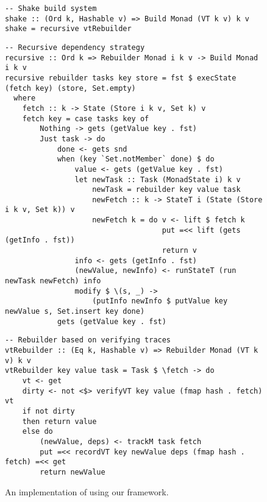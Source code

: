 \begin{figure}
\begin{verbatim}
-- Shake build system
shake :: (Ord k, Hashable v) => Build Monad (VT k v) k v
shake = recursive vtRebuilder
\end{verbatim}
\vspace{1mm}
\begin{verbatim}
-- Recursive dependency strategy
recursive :: Ord k => Rebuilder Monad i k v -> Build Monad i k v
recursive rebuilder tasks key store = fst $ execState (fetch key) (store, Set.empty)
  where
    fetch :: k -> State (Store i k v, Set k) v
    fetch key = case tasks key of
        Nothing -> gets (getValue key . fst)
        Just task -> do
            done <- gets snd
            when (key `Set.notMember` done) $ do
                value <- gets (getValue key . fst)
                let newTask :: Task (MonadState i) k v
                    newTask = rebuilder key value task
                    newFetch :: k -> StateT i (State (Store i k v, Set k)) v
                    newFetch k = do v <- lift $ fetch k
                                    put =<< lift (gets (getInfo . fst))
                                    return v
                info <- gets (getInfo . fst)
                (newValue, newInfo) <- runStateT (run newTask newFetch) info
                modify $ \(s, _) ->
                    (putInfo newInfo $ putValue key newValue s, Set.insert key done)
            gets (getValue key . fst)
\end{verbatim}
\vspace{1mm}
\begin{verbatim}
-- Rebuilder based on verifying traces
vtRebuilder :: (Eq k, Hashable v) => Rebuilder Monad (VT k v) k v
vtRebuilder key value task = Task $ \fetch -> do
    vt <- get
    dirty <- not <$> verifyVT key value (fmap hash . fetch) vt
    if not dirty
    then return value
    else do
        (newValue, deps) <- trackM task fetch
        put =<< recordVT key newValue deps (fmap hash . fetch) =<< get
        return newValue
\end{verbatim}
\vspace{-3mm}
\caption{An implementation of \Shake using our framework.}\label{fig-shake-implementation}
\vspace{1mm}
\end{figure}

\vspace{-2mm}
\subsection{\Bazel}\label{sec-implementation-bazel}
\vspace{-1mm}


